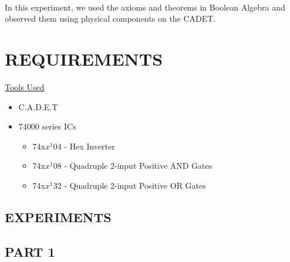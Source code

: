 \documentclass[pdftex,12pt,a4paper]{article}
\begin{document}
\begin{flushleft}
\paragraph{}
In this experiment, we used the axioms and theorems in Boolean Algebra and observed them using physical components on the CADET.
\end{flushleft}
\section{REQUIREMENTS}

\begin{flushleft}
\underline{Tools Used}
\end{flushleft}
\begin{itemize}
    \item C.A.D.E.T
    \item 74000 series ICs
    \begin{itemize}
        \item 74x$x^{1}$04 - Hex Inverter
        \item 74x$x^{1}$08 - Quadruple 2-input Positive AND Gates
        \item 74x$x^{1}$32 - Quadruple 2-input Positive OR Gates
    \end{itemize}
\end{itemize}

\begin{flushleft}
\section{EXPERIMENTS}
\subsection{PART 1}
\end{flushleft}
\end{document}
